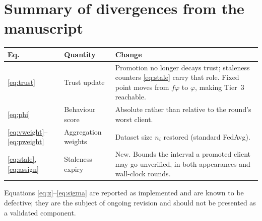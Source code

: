 \section{Summary of divergences from the manuscript}

\begin{center}
\begin{tabular}{@{}llp{6.6cm}@{}}
\toprule
\textbf{Eq.} & \textbf{Quantity} & \textbf{Change} \\
\midrule
\eqref{eq:trust} & Trust update &
Promotion no longer decays trust; staleness counters
\eqref{eq:stale} carry that role. Fixed point moves from $f\varphi$ to
$\varphi$, making Tier~3 reachable. \\[4pt]
\eqref{eq:phi} & Behaviour score &
Absolute rather than relative to the round's worst client. \\[4pt]
\eqref{eq:vweight}--\eqref{eq:pweight} & Aggregation weights &
Dataset size $n_i$ restored (standard FedAvg). \\[4pt]
\eqref{eq:stale}, \eqref{eq:assign} & Staleness expiry &
New. Bounds the interval a promoted client may go unverified, in both
appearances and wall-clock rounds. \\
\bottomrule
\end{tabular}
\end{center}

\medskip
\noindent
Equations \eqref{eq:z}--\eqref{eq:sigma} are reported as implemented and are
known to be defective; they are the subject of ongoing revision and should not
be presented as a validated component.


